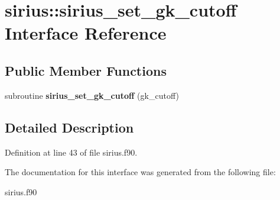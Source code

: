 \hypertarget{interfacesirius_1_1sirius__set__gk__cutoff}{}\section{sirius\+:\+:sirius\+\_\+set\+\_\+gk\+\_\+cutoff Interface Reference}
\label{interfacesirius_1_1sirius__set__gk__cutoff}
\subsection*{Public Member Functions}
\begin{DoxyCompactItemize}
\item 
\hypertarget{interfacesirius_1_1sirius__set__gk__cutoff_a133ae3cd2366f7629fc63d93351938ae}{}subroutine {\bfseries sirius\+\_\+set\+\_\+gk\+\_\+cutoff} (gk\+\_\+cutoff)\label{interfacesirius_1_1sirius__set__gk__cutoff_a133ae3cd2366f7629fc63d93351938ae}

\end{DoxyCompactItemize}


\subsection{Detailed Description}


Definition at line 43 of file sirius.\+f90.



The documentation for this interface was generated from the following file\+:\begin{DoxyCompactItemize}
\item 
sirius.\+f90\end{DoxyCompactItemize}
